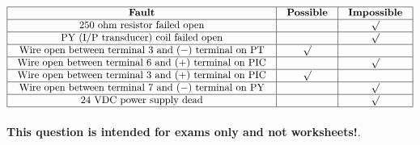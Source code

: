






$$\vbox{\offinterlineskip
\halign{\strut
\vrule \quad\hfil # \ \hfil & 
\vrule \quad\hfil # \ \hfil & 
\vrule \quad\hfil # \ \hfil \vrule \cr
\noalign{\hrule}
%
{\bf Fault} & {\bf Possible} & {\bf Impossible} \cr
%
\noalign{\hrule}
%
250 ohm resistor failed open &  & $\surd$ \cr
%
\noalign{\hrule}
%
PY (I/P transducer) coil failed open &  & $\surd$ \cr
%
\noalign{\hrule}
%
Wire open between terminal 3 and ($-$) terminal on PT & $\surd$ &  \cr
%
\noalign{\hrule}
%
Wire open between terminal 6 and (+) terminal on PIC &  & $\surd$ \cr
%
\noalign{\hrule}
%
Wire open between terminal 3 and (+) terminal on PIC & $\surd$ &  \cr
%
\noalign{\hrule}
%
Wire open between terminal 7 and ($-$) terminal on PY &  & $\surd$ \cr
%
\noalign{\hrule}
%
24 VDC power supply dead &  & $\surd$ \cr
%
\noalign{\hrule}
} %
}$$ %







{\bf This question is intended for exams only and not worksheets!}.



